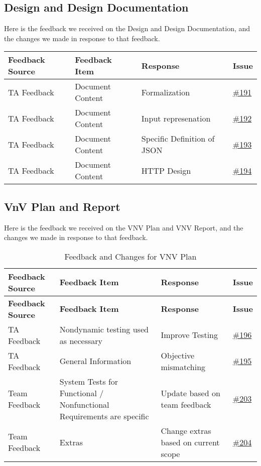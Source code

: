 \documentclass{article}
\begin{document}
\subsection{Design and Design Documentation}

Here is the feedback we received on the Design and Design Documentation, and the changes we made in response to that feedback.
\begin{longtable}{| p{} | p{} | p{} | p{} |}
\hline
\textbf{Feedback Source} & \textbf{Feedback Item} & \textbf{Response} & \textbf{Issue} \\
\hline
TA Feedback & Document Content & Formalization  & \href{https://github.com/RezaJodeiri/CXR-Capstone/issues/191}{\#191} \\
\hline
TA Feedback & Document Content & Input represenation & \href{https://github.com/RezaJodeiri/CXR-Capstone/issues/192}{\#192} \\
\hline
TA Feedback & Document Content & Specific Definition of JSON & \href{https://github.com/RezaJodeiri/CXR-Capstone/issues/193}{\#193} \\
\hline
TA Feedback & Document Content & HTTP Design & \href{https://github.com/RezaJodeiri/CXR-Capstone/issues/194}{\#194} \\
\hline
\end{longtable}

\subsection{VnV Plan and Report}

Here is the feedback we received on the VNV Plan and VNV  Report, and the changes we made in response to that feedback.

\begin{longtable}{| p{} | p{} | p{} | p{} |}
    \caption{Feedback and Changes for VNV Plan} \\
    \hline
    \textbf{Feedback Source} & \textbf{Feedback Item} & \textbf{Response} & \textbf{Issue} \\
    \hline
    \endfirsthead
    \hline
    \textbf{Feedback Source} & \textbf{Feedback Item} & \textbf{Response} & \textbf{Issue} \\
    \hline
    \endhead
    \hline
    \endfoot
    TA Feedback & Nondynamic testing used as necessary & Improve Testing & \href{https://github.com/RezaJodeiri/CXR-Capstone/issues/196}{\#196} \\
    \hline
    TA Feedback & General Information & Objective mismatching & \href{https://github.com/RezaJodeiri/CXR-Capstone/issues/195}{\#195} \\
    \hline
    Team Feedback & System Tests for Functional / Nonfunctional Requirements are specific & Update based on team feedback & \href{https://github.com/RezaJodeiri/CXR-Capstone/issues/203}{\#203}\\
    \hline
    Team Feedback & Extras & Change extras based on current scope & \href{https://github.com/RezaJodeiri/CXR-Capstone/issues/204}{\#204}\\
    \hline

\end{longtable}
\end{document}
